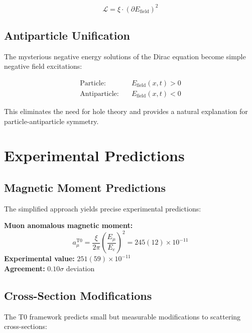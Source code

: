 \documentclass[12pt,a4paper]{report}
\begin{document}
\begin{equation}
	\boxed{\mathcal{L} = \xi \cdot (\partial E_{\text{field}})^2}
	\label{eq:universal_lagrangian}
\end{equation}

\subsection{Antiparticle Unification}
\label{subsec:antiparticle_unification}

The mysterious negative energy solutions of the Dirac equation become simple negative field excitations:

\begin{align}
	\text{Particle:} \quad &E_{\text{field}}(x,t) > 0 \\
	\text{Antiparticle:} \quad &E_{\text{field}}(x,t) < 0
\end{align}

This eliminates the need for hole theory and provides a natural explanation for particle-antiparticle symmetry.

\section{Experimental Predictions}
\label{sec:experimental_predictions}

\subsection{Magnetic Moment Predictions}
\label{subsec:magnetic_moment_predictions}

The simplified approach yields precise experimental predictions:

\textbf{Muon anomalous magnetic moment:}
\begin{equation}
	a_\mu^{\text{T0}} = \frac{\xi}{2\pi} \left(\frac{E_\mu}{E_e}\right)^2 = 245(12) \times 10^{-11}
\end{equation}
\textbf{Experimental value:} $251(59) \times 10^{-11}$ \\
\textbf{Agreement:} $0.10\sigma$ deviation

\subsection{Cross-Section Modifications}
\label{subsec:cross_section_modifications}

The T0 framework predicts small but measurable modifications to scattering cross-sections:
\end{document}
